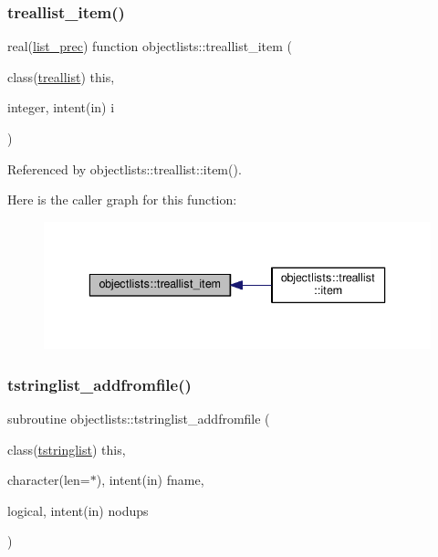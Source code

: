 \subsubsection{\texorpdfstring{treallist\+\_\+item()}{treallist\_item()}}
{\footnotesize\ttfamily real(\mbox{\hyperlink{namespaceobjectlists_a9d176bc6347eefeceba8cb520c6be81c}{list\+\_\+prec}}) function objectlists\+::treallist\+\_\+item (\begin{DoxyParamCaption}\item[{class(\mbox{\hyperlink{structobjectlists_1_1treallist}{treallist}})}]{this,  }\item[{integer, intent(in)}]{i }\end{DoxyParamCaption})\hspace{0.3cm}{\ttfamily [private]}}



Referenced by objectlists\+::treallist\+::item().

Here is the caller graph for this function\+:
\nopagebreak
\begin{figure}[H]
\begin{center}
\leavevmode
\includegraphics[width=336pt]{namespaceobjectlists_a7f2de098afb2605d8dccf08bd7daca10_icgraph}
\end{center}
\end{figure}
\mbox{\label{namespaceobjectlists_a53c9a728110b79f25cc56f9b63554deb}} 
\subsubsection{\texorpdfstring{tstringlist\+\_\+addfromfile()}{tstringlist\_addfromfile()}}
{\footnotesize\ttfamily subroutine objectlists\+::tstringlist\+\_\+addfromfile (\begin{DoxyParamCaption}\item[{class(\mbox{\hyperlink{structobjectlists_1_1tstringlist}{tstringlist}})}]{this,  }\item[{character(len=$\ast$), intent(in)}]{fname,  }\item[{logical, intent(in)}]{nodups }\end{DoxyParamCaption})\hspace{0.3cm}{\ttfamily [private]}}

